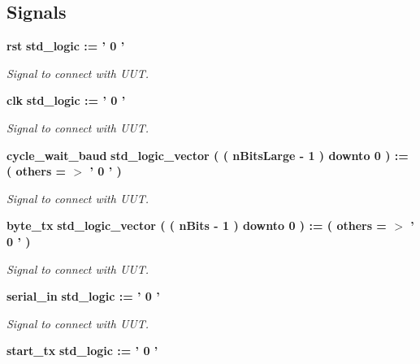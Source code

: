 \subsection*{Signals}
 \begin{DoxyCompactItemize}
\item 
{\bf rst} {\bfseries std\-\_\-logic  \-:= '  0  ' } \label{classtest_uart__communication__block_1_1behavior_a248880720a09137a5e04e70521001f1b}

\begin{DoxyCompactList}\small\item\em Signal to connect with U\-U\-T. \end{DoxyCompactList}\item 
{\bf clk} {\bfseries std\-\_\-logic  \-:= '  0  ' } \label{classtest_uart__communication__block_1_1behavior_a558455b32aceac51fe4f45fc29deeda2}

\begin{DoxyCompactList}\small\item\em Signal to connect with U\-U\-T. \end{DoxyCompactList}\item 
{\bf cycle\-\_\-wait\-\_\-baud} {\bfseries std\-\_\-logic\-\_\-vector (  ( n\-Bits\-Large -\/   1  )    downto    0  )  \-:= (  others  = $>$ '  0  '  ) } \label{classtest_uart__communication__block_1_1behavior_a4c08915531add3ce903585abd8aa7c32}

\begin{DoxyCompactList}\small\item\em Signal to connect with U\-U\-T. \end{DoxyCompactList}\item 
{\bf byte\-\_\-tx} {\bfseries std\-\_\-logic\-\_\-vector (  ( n\-Bits -\/   1  )    downto    0  )  \-:= (  others  = $>$ '  0  '  ) } \label{classtest_uart__communication__block_1_1behavior_a51999b58f4bf8bec91d41e23ba241e9f}

\begin{DoxyCompactList}\small\item\em Signal to connect with U\-U\-T. \end{DoxyCompactList}\item 
{\bf serial\-\_\-in} {\bfseries std\-\_\-logic  \-:= '  0  ' } \label{classtest_uart__communication__block_1_1behavior_aa9ffae81538ad5181d6c756c3cd7df2e}

\begin{DoxyCompactList}\small\item\em Signal to connect with U\-U\-T. \end{DoxyCompactList}\item 
{\bf start\-\_\-tx} {\bfseries std\-\_\-logic  \-:= '  0  ' } \label{classtest_uart__communication__block_1_1behavior_acc9c08fe2957eb6987969db4ad32eb3f}


\end{DoxyCompactItemize}
